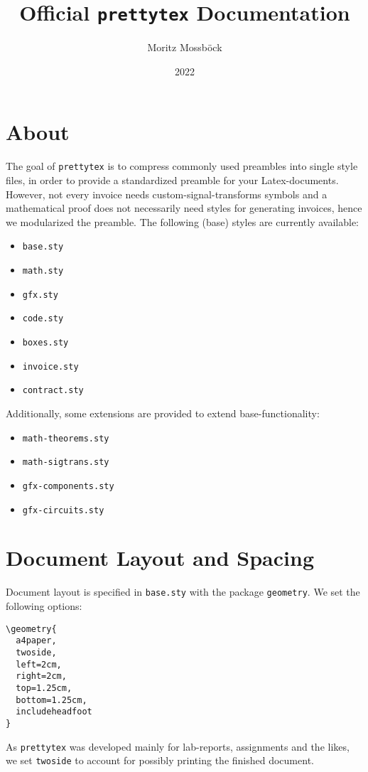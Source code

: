 \documentclass{article}
\author{Moritz Mossböck}
\date{2022}
\title{Official \texttt{prettytex} Documentation}
\newcommand{\prettytex}{\texttt{prettytex} }
\begin{document}
  \maketitle
  \tableofcontents
  \newpage

  \section{About}
  The goal of \prettytex is to compress commonly used preambles into single style files, in order to provide a
  standardized preamble for your Latex-documents. However, not every invoice needs custom-signal-transforms symbols
  and a mathematical proof does not necessarily need styles for generating invoices, hence we modularized the
  preamble. The following (base) styles are currently available:
  \begin{itemize}
    \item \texttt{base.sty}
    \item \texttt{math.sty}
    \item \texttt{gfx.sty}
    \item \texttt{code.sty}
    \item \texttt{boxes.sty}
    \item \texttt{invoice.sty}
    \item \texttt{contract.sty}
  \end{itemize}

  Additionally, some extensions are provided to extend base-functionality:
  \begin{itemize}
    \item \texttt{math-theorems.sty}
    \item \texttt{math-sigtrans.sty}
    \item \texttt{gfx-components.sty}
    \item \texttt{gfx-circuits.sty}
  \end{itemize}


  \section{Document Layout and Spacing}
  Document layout is specified in \verb|base.sty| with the package \verb|geometry|. We set the following options:
  \begin{verbatim}
\geometry{
  a4paper,
  twoside,
  left=2cm,
  right=2cm,
  top=1.25cm,
  bottom=1.25cm,
  includeheadfoot
}
\end{verbatim}

  As \verb|prettytex| was developed mainly for lab-reports, assignments and the likes, we set \verb|twoside| to
  account for possibly printing the finished document.
\end{document}
